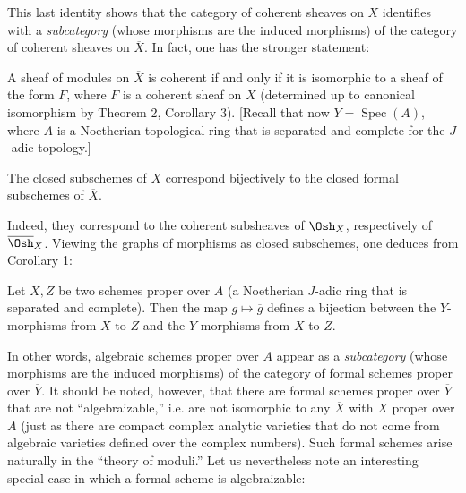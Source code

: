 This last identity shows that the category of coherent sheaves on $X$
identifies with a \emph{subcategory} (whose morphisms are the induced
morphisms) of the category of coherent sheaves on $\overline X$. In fact, one
has the stronger statement:

 A sheaf of modules on $\overline X$ is coherent if and only
if it is isomorphic to a sheaf of the form $\overline F$, where $F$ is a
coherent sheaf on $X$ (determined up to canonical isomorphism by Theorem 2,
Corollary 3). [Recall that now $Y=\operatorname{Spec}(A)$, where $A$ is a
Noetherian topological ring that is separated and complete for the $J$-adic
topology.]

 The closed subschemes of $X$ correspond bijectively to
the closed formal subschemes of $\overline X$.

Indeed, they correspond to the coherent subsheaves of $\Osh_X$, respectively
of $\overline{\Osh}_X$. Viewing the graphs of morphisms as closed subschemes,
one deduces from Corollary 1:

 Let $X,Z$ be two schemes proper over $A$ (a Noetherian
$J$-adic ring that is separated and complete). Then the map
$g\longmapsto\overline g$ defines a bijection between the $Y$-morphisms from
$X$ to $Z$ and the $\overline Y$-morphisms from $\overline X$ to
$\overline Z$.

In other words, algebraic schemes proper over $A$ appear as a
\emph{subcategory} (whose morphisms are the induced morphisms) of the category
of formal schemes proper over $\overline Y$. It should be noted, however, that
there are formal schemes proper over $\overline Y$ that are not
“algebraizable,” i.e. are not isomorphic to any $\overline X$ with $X$ proper
over $A$ (just as there are compact complex analytic varieties that do not
come from algebraic varieties defined over the complex numbers). Such formal
schemes arise naturally in the “theory of moduli.” Let us nevertheless note
an interesting special case in which a formal scheme is algebraizable:

